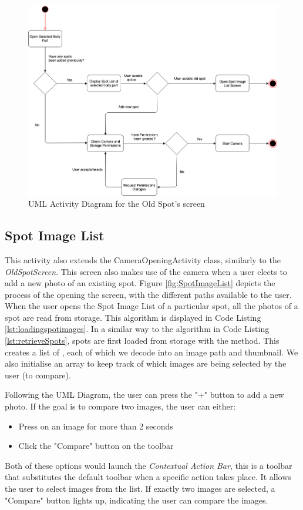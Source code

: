\begin{figure}
    \includegraphics[width=1.2\textwidth, center]{figures/OldSpotList.png}
    \caption{UML Activity Diagram for the Old Spot's screen}
    \label{fig:OldSpotList}
\end{figure}

\subsection{Spot Image List}

This activity also extends the CameraOpeningActivity class, similarly to the \emph{OldSpotScreen}. This screen also makes use of the camera when a user elects to add a new photo of an existing spot. Figure \ref{fig:SpotImageList} depicts the process of the opening the screen, with the different paths available to the user. When the user opens the Spot Image List of a particular spot, all the photos of a spot are read from storage. This algorithm is displayed in Code Listing \ref{lst:loadingspotimages}. In a similar way to the algorithm in Code Listing \ref{lst:retrieveSpots}, spots are first loaded from storage with the  method. This creates a list of , each of which we decode into an image path and thumbnail. We also initialise an array  to keep track of which images are being selected by the user (to compare).

Following the UML Diagram, the user can press the "+" button to add a new photo. If the goal is to compare two images, the user can either:
\begin{itemize}
    \item Press on an image for more than 2 seconds
    \item Click the "Compare" button on the toolbar
\end{itemize}
Both of these options would launch the \emph{Contextual Action Bar}, this is a toolbar that substitutes the default toolbar when a specific action takes place. It allows the user to select images from the list. If exactly two images are selected, a "Compare" button lights up, indicating the user can compare the images.

